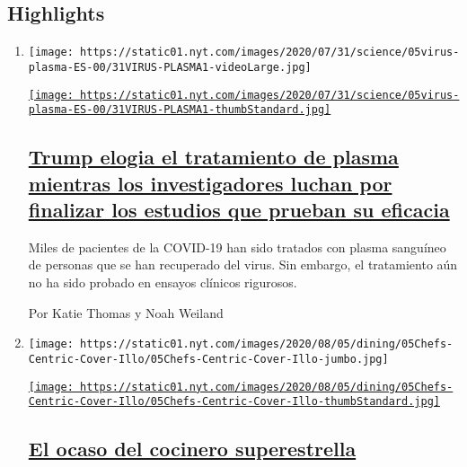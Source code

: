 \hypertarget{highlights}{%
\subsection{Highlights}\label{highlights}}

\begin{enumerate}
\def\labelenumi{\arabic{enumi}.}
\item
  \texttt{[image: https://static01.nyt.com/images/2020/07/31/science/05virus-plasma-ES-00/31VIRUS-PLASMA1-videoLarge.jpg]}

  \href{/es/2020/08/07/espanol/ciencia-y-tecnologia/plasma-convaleciente-coronavirus.html}{\texttt{[image: https://static01.nyt.com/images/2020/07/31/science/05virus-plasma-ES-00/31VIRUS-PLASMA1-thumbStandard.jpg]}}

  \hypertarget{trump-elogia-el-tratamiento-de-plasma-mientras-los-investigadores-luchan-por-finalizar-los-estudios-que-prueban-su-eficacia}{%
  \subsection{\texorpdfstring{\href{/es/2020/08/07/espanol/ciencia-y-tecnologia/plasma-convaleciente-coronavirus.html}{Trump
  elogia el tratamiento de plasma mientras los investigadores luchan por
  finalizar los estudios que prueban su
  eficacia}}{Trump elogia el tratamiento de plasma mientras los investigadores luchan por finalizar los estudios que prueban su eficacia}}\label{trump-elogia-el-tratamiento-de-plasma-mientras-los-investigadores-luchan-por-finalizar-los-estudios-que-prueban-su-eficacia}}

  Miles de pacientes de la COVID-19 han sido tratados con plasma
  sanguíneo de personas que se han recuperado del virus. Sin embargo, el
  tratamiento aún no ha sido probado en ensayos clínicos rigurosos.

  Por Katie Thomas y Noah Weiland
\item
  \texttt{[image: https://static01.nyt.com/images/2020/08/05/dining/05Chefs-Centric-Cover-Illo/05Chefs-Centric-Cover-Illo-jumbo.jpg]}

  \href{/es/2020/08/08/espanol/estilos-de-vida/chef-restaurante-cultura.html}{\texttt{[image: https://static01.nyt.com/images/2020/08/05/dining/05Chefs-Centric-Cover-Illo/05Chefs-Centric-Cover-Illo-thumbStandard.jpg]}}

  \hypertarget{el-ocaso-del-cocinero-superestrella}{%
  \subsection{\texorpdfstring{\href{/es/2020/08/08/espanol/estilos-de-vida/chef-restaurante-cultura.html}{El
  ocaso del cocinero
  superestrella}}{El ocaso del cocinero superestrella}}\label{el-ocaso-del-cocinero-superestrella}}


\end{enumerate}
